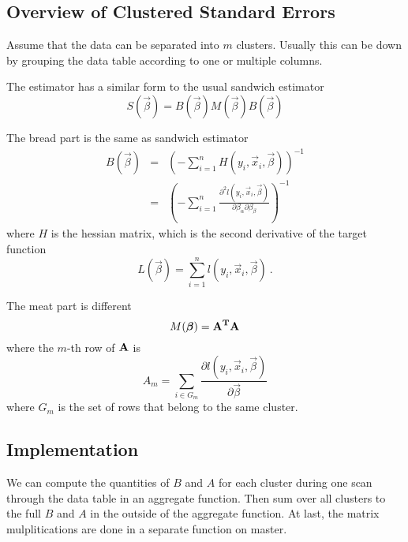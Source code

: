 \subsection{Overview of Clustered Standard Errors}

Assume that the data can be separated into $m$ clusters. Usually this
can be down by grouping the data table according to one or multiple
columns.

The estimator has a similar form to the usual sandwich estimator
\begin{equation}
  S(\vec{\beta}) = B(\vec{\beta}) M(\vec{\beta}) B(\vec{\beta})
\end{equation}

The bread part is the same as sandwich estimator
\begin{eqnarray}
  B(\vec{\beta}) & = & \left(-\sum_{i=1}^{n} H(y_i, \vec{x}_i,
    \vec{\beta})\right)^{-1}\\
  & = & \left(-\sum_{i=1}^{n}\frac{\partial^2 l(y_i, \vec{x}_i,
      \vec{\beta})}{\partial \beta_\alpha \partial \beta_\beta}\right)^{-1}
\end{eqnarray}
where $H$ is the hessian matrix, which is the second derivative of the
target function
\begin{equation}
  L(\vec{\beta}) = \sum_{i=1}^n l(y_i, \vec{x}_i, \vec{\beta})\ .
\end{equation}

The meat part is different
\begin{equation}
  M(\vec{\beta}) = \bf{A}^T\bf{A}
\end{equation}
where the $m$-th row of $\bf{A}$ is
\begin{equation}
  A_m = \sum_{i\in G_m}\frac{\partial
      l(y_i,\vec{x}_i,\vec{\beta})}{\partial \vec{\beta}}
\end{equation}
where $G_m$ is the set of rows that belong to the same cluster.

\subsection{Implementation}

We can compute the quantities of $B$ and $A$ for each cluster during one scan
through the data table in an aggregate function. Then sum over all clusters to
the full $B$ and $A$ in the outside of the aggregate function. At last, the
matrix mulplitications are done in a separate function on master.

